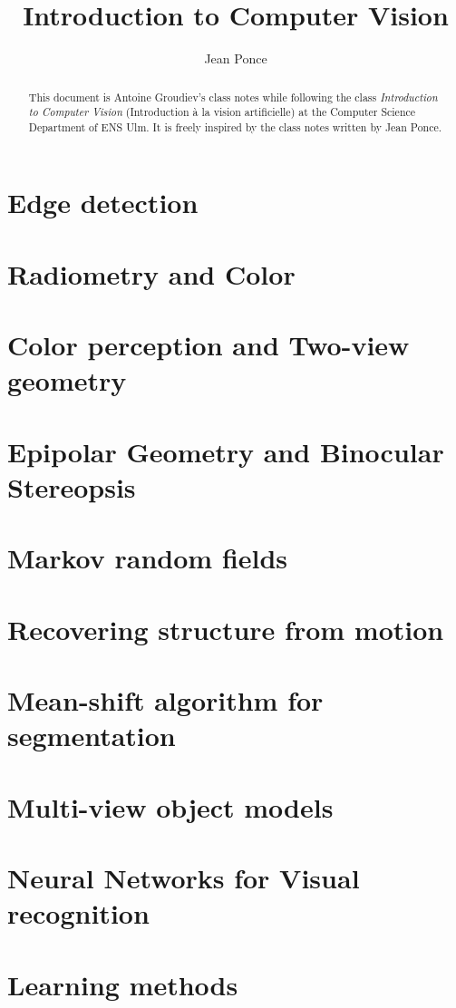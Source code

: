 \documentclass[toc, titlepaged]{../cs-classes/cs-classes}
\title{Introduction to Computer Vision}
\author{Jean Ponce}
\begin{document}
\begin{abstract}
    This document is Antoine Groudiev's class notes while following the class \emph{Introduction to Computer Vision} (Introduction à la vision artificielle) at the Computer Science Department of ENS Ulm. It is freely inspired by the class notes written by Jean Ponce.
\end{abstract}






\section{Edge detection}

\section{Radiometry and Color}

\section{Color perception and Two-view geometry}

\section{Epipolar Geometry and Binocular Stereopsis}

\section{Markov random fields}

\section{Recovering structure from motion}

\section{Mean-shift algorithm for segmentation}

\section{Multi-view object models}

\section{Neural Networks for Visual recognition}

\section{Learning methods}
\end{document}
